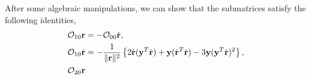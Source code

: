 After some algebraic manipulations, we can show that the submatrices satisfy the following identities, 
\begin{align}
\mathcal{O}_{10}\r & = 
-\mathcal{O}_{00}\dot\r,\label{eqn:O10r}\\
\mathcal{O}_{10}\dot\r & = -\frac{1}{\|\r\|^2}\braces{
{2\dot\r(\y^T\dot \r)  +\y(\dot\r^T\dot \r)}
- 3\y(\y^T\dot\r)^2},\label{eqn:O10dotr}\\
\mathcal{O}_{20}\r %

\end{align}
